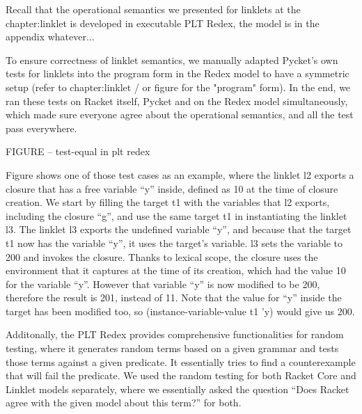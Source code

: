 			\begin{paragraph-here}%
				Recall that the operational semantics we presented for linklets at the chapter:linklet is developed in executable PLT Redex, the model is in the appendix whatever...
			\end{paragraph-here}

			\begin{paragraph-here}%
				To ensure correctness of linklet semantics, we manually adapted Pycket's own tests for linklets into the program form in the Redex model to have a symmetric setup (refer to chapter:linklet / or figure for the "program" form). In the end, we ran these tests on Racket itself, Pycket and on the Redex model simultaneously, which made sure everyone agree about the operational semantics, and all the test pass everywhere.
			\end{paragraph-here}

			\begin{figure-here}
				FIGURE -- test-equal in plt redex
			\end{figure-here}

			\begin{paragraph-here}%
				Figure shows one of those test cases as an example, where the linklet l2 exports a closure that has a free variable “y” inside, defined as 10 at the time of closure creation. We start by filling the target t1 with the variables that l2 exports, including the closure “g”, and use the same target t1 in instantiating the linklet l3. The linklet l3 exports the undefined variable “y”, and because that the target t1 now has the variable “y”, it uses the target’s variable. l3 sets the variable to 200 and invokes the closure. Thanks to lexical scope, the closure uses the environment that it captures at the time of its creation, which had the value 10 for the variable “y”. However that variable “y” is now modified to be 200, therefore the result is 201, instead of 11. Note that the value for “y” inside the target has been modified too, so (instance-variable-value t1 ’y) would give us 200.
			\end{paragraph-here}

			\begin{paragraph-here}%
				Additonally, the PLT Redex provides comprehensive functionalities for random testing, where it generates random terms based on a given grammar and tests those terms against a given predicate. It essentially tries to find a counterexample that will fail the predicate. We used the random testing for both Racket Core and Linklet models separately, where we essentially asked the question “Does Racket agree with the given model about this term?” for both.
			\end{paragraph-here}

